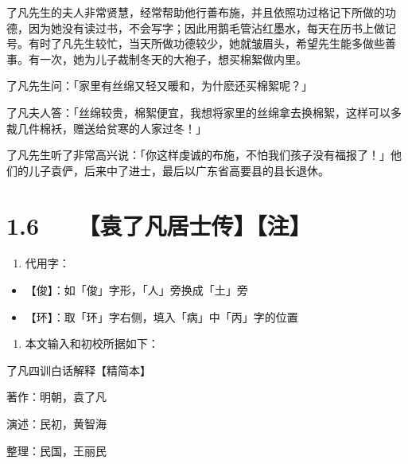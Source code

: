 \documentclass[letterpaper,10pt,english]{sphinxmanual}
\begin{document}
了凡先生的夫人非常贤慧，经常帮助他行善布施，并且依照功过格记下所做的功德，因为她没有读过书，不会写字；因此用鹅毛管沾红墨水，每天在历书上做记号。有时了凡先生较忙，当天所做功德较少，她就皱眉头，希望先生能多做些善事。有一次，她为儿子裁制冬天的大袍子，想买棉絮做内里。

了凡先生问：「家里有丝绵又轻又暖和，为什麽还买棉絮呢？」

了凡夫人答：「丝绵较贵，棉絮便宜，我想将家里的丝绵拿去换棉絮，这样可以多裁几件棉袄，赠送给贫寒的人家过冬！」

了凡先生听了非常高兴说：「你这样虔诚的布施，不怕我们孩子没有福报了！」他们的儿子袁俨，后来中了进士，最后以广东省高要县的县长退休。


\section{1.6   【袁了凡居士传】【注】}
\label{\detokenize{p00_u5176_u5b83/_u8881_u4e86_u51e1-_u4e86_u51e1_u56db_u8bad:id8}}\begin{enumerate}
%
\item {} 
代用字：

\end{enumerate}
\begin{itemize}
\item {} 
【俊】：如「俊」字形，「人」旁换成「土」旁

\item {} 
【环】：取「环」字右侧，填入「病」中「丙」字的位置

\end{itemize}
\begin{enumerate}
%
\setcounter{enumi}{1}
\item {} 
本文输入和初校所据如下：

\end{enumerate}

了凡四训白话解释【精简本】

著作：明朝，袁了凡

演述：民初，黄智海

整理：民国，王丽民
\end{document}
